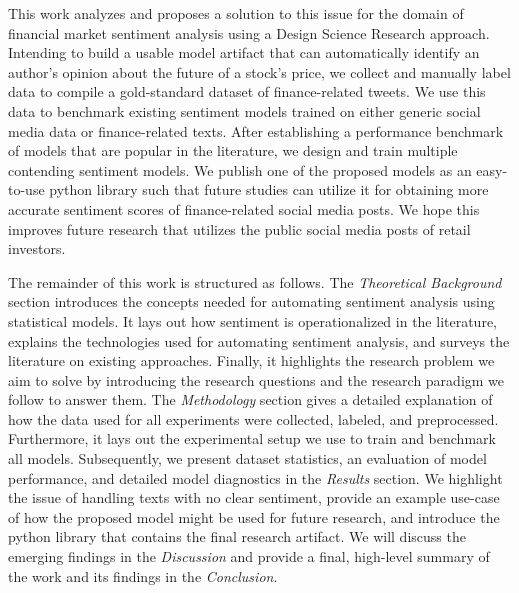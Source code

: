 This work analyzes and proposes a solution to this issue for the domain of financial market sentiment analysis using a Design Science Research approach. Intending to build a usable model artifact that can automatically identify an author's opinion about the future of a stock's price, we collect and manually label data to compile a gold-standard dataset of finance-related tweets. We use this data to benchmark existing sentiment models trained on either generic social media data or finance-related texts. After establishing a performance benchmark of models that are popular in the literature, we design and train multiple contending sentiment models. We publish one of the proposed models as an easy-to-use python library such that future studies can utilize it for obtaining more accurate sentiment scores of finance-related social media posts. We hope this improves future research that utilizes the public social media posts of retail investors.

The remainder of this work is structured as follows. The \emph{Theoretical Background} section introduces the concepts needed for automating sentiment analysis using statistical models. It lays out how sentiment is operationalized in the literature, explains the technologies used for automating sentiment analysis, and surveys the literature on existing approaches. Finally, it highlights the research problem we aim to solve by introducing the research questions and the research paradigm we follow to answer them. The \emph{Methodology} section gives a detailed explanation of how the data used for all experiments were collected, labeled, and preprocessed. Furthermore, it lays out the experimental setup we use to train and benchmark all models. Subsequently, we present dataset statistics, an evaluation of model performance, and detailed model diagnostics in the \emph{Results} section. We highlight the issue of handling texts with no clear sentiment, provide an example use-case of how the proposed model might be used for future research, and introduce the python library that contains the final research artifact. We will discuss the emerging findings in the \emph{Discussion} and provide a final, high-level summary of the work and its findings in the \emph{Conclusion}.

